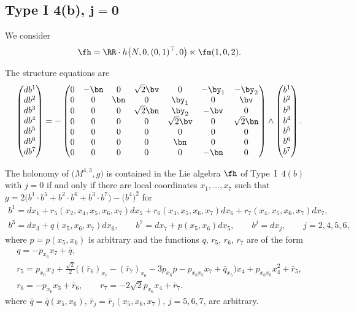\subsection[Type I 4(b), $j=0$]{Type I 4(b), $\boldsymbol{j=0}$}
We consider
\begin{gather*}\fh=\RR\cdot h\big(N,0,(0,1)^\top,0\big) \ltimes\fm(1,0,2).\end{gather*}

The structure equations are
\begin{gather}\label{EI4(b)}\left(\begin{matrix} db^1\\db^2\\db^3\\db^4\\db^5\\db^6\\db^7\end{matrix}\right) = -\left(
\begin{matrix}
0 &-\bn&0&\sqrt 2 \bv&0&-\by_1&-\by_2\\
0&0&\bn&0&\by_1&0&\bv\\
0&0&0&\sqrt 2 \bn&\by_2&-\bv&0\\
0&0&0&0&\sqrt 2 \bv&0&\sqrt 2 \bn\\
0&0&0&0&0&0&0\\
0&0&0&0&\bn&0&0\\
0&0&0&0&0&-\bn&0
\end{matrix}\right) \wedge \left(\begin{matrix} b^1\\b^2\\b^3\\b^4\\b^5\\b^6\\b^7\end{matrix}\right).
\end{gather}

\begin{Proposition} The holonomy of $\big(M^{4,3},g\big)$ is contained in the Lie algebra $\fh$ of Type~I~$4(b)$ with $j=0$ if and only if there are local coordinates $x_1,\dots,x_7$ such that $g=2\big(b^1\cdot b^5+b^2\cdot b^6+b^3\cdot b^7\big)- \big(b^4\big)^2$ for
\begin{gather*}
b^1=dx_1 + r_5(x_2,x_4,x_5,x_6, x_7)dx_5+r_6(x_3,x_5,x_6,x_7)dx_6+r_7(x_4,x_5,x_6,x_7)dx_7, \\
b^3= dx_3+q(x_5,x_6,x_7) dx_6, \qquad
b^7= dx_7 +p(x_5,x_6)dx_5,\qquad
b^j= dx_j, \qquad j=2,4,5,6,
\end{gather*}
where
$p=p(x_5,x_6)$ is arbitrary and the functions $q$, $r_5$, $r_6$, $r_7$ are of the form
\begin{gather*}
q=-p_{x_6}x_7+\bar q, \\
r_5=p_{x_6}x_2+ \tfrac{\sqrt2}2 \big( (\bar r_6)_{x_7}-(\bar r_7)_{x_6}-3p_{x_6}p-p_{x_6x_5}x_7+\bar q_{x_5}\big)x_4+p_{x_6 x_6}x_4^2+\bar r_5,\\
r_6=-p_{x_6}x_3+\bar r_6, \qquad
r_7=-2\sqrt2 p_{x_6}x_4+\bar r_7.
\end{gather*}
where
$\bar q=\bar q(x_5,x_6)$, $\bar r_j =\bar r_j (x_5,x_6,x_7)$, $j=5,6,7$, are arbitrary.
\end{Proposition}

